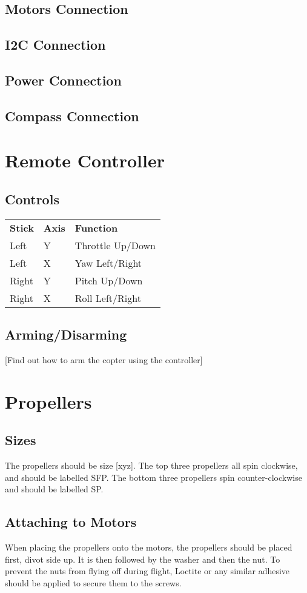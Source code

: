 \documentclass{style}
\begin{document}
\subsection{Motors Connection}
\subsection{I2C Connection}
\subsection{Power Connection}
\subsection{Compass Connection}
\section{Remote Controller}
\subsection{Controls}
\begin{tabular}{ l l l }
  \textbf{Stick} & \textbf{Axis} & \textbf{Function} \\
  Left & Y & Throttle Up/Down \\
  Left & X & Yaw Left/Right \\
  Right & Y & Pitch Up/Down \\
  Right & X & Roll Left/Right
\end{tabular}
\subsection{Arming/Disarming}
[Find out how to arm the copter using the controller]
\section{Propellers}
\subsection{Sizes}
The propellers should be size [xyz].  The top three propellers all spin clockwise, and should be labelled SFP.  The bottom three propellers spin counter-clockwise and should be labelled SP.
\subsection{Attaching to Motors}
When placing the propellers onto the motors, the propellers should be placed first, divot side up.
It is then followed by the washer and then the nut.
To prevent the nuts from flying off during flight, Loctite or any similar adhesive should be applied to secure them to the screws.
\end{document}
